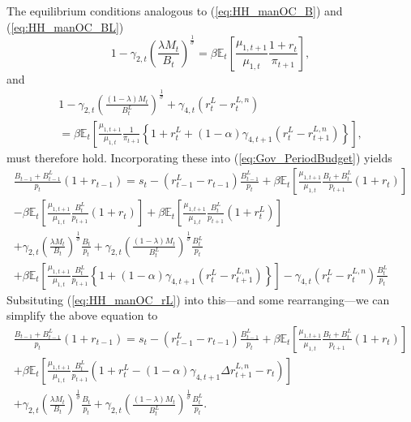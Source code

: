 \documentclass[11pt,a4paper,margin=1.5in]{article}
\begin{document}
The equilibrium conditions analogous to (\ref{eq:HH_manOC_B}) and (\ref{eq:HH_manOC_BL})
\begin{equation*}
	1 - \gamma_{2,t}\left(\frac{\lambda M_t}{B_t}\right)^\frac{1}{\sigma} = \beta \mathbb{E}_t\!\left[\frac{\mu_{1,t+1}}{\mu_{1,t}}\frac{1+r_t}{\pi_{t+1}}\right],
	\label{eq:HH_manOC_B_Alt}
\end{equation*}
and 
\begin{multline*}
	1 - \gamma_{2,t}\left(\frac{(1-\lambda)M_t}{B^L_t}\right)^\frac{1}{\sigma} + \gamma_{4,t}\left(r^L_t-r^{L,n}_t\right) \\
	= \beta \mathbb{E}_t\!\left[\frac{\mu_{1,t+1}}{\mu_{1,t}}\frac{1}{\pi_{t+1}} \left\{ 1+r^L_t + (1-\alpha)\gamma_{4,t+1} \left(r^L_t-r^{L,n}_{t+1}\right)\right\}\right],
	\label{eq:HH_manOC_BL_Alt}
\end{multline*}
must therefore hold.
Incorporating these into (\ref{eq:Gov_PeriodBudget}) yields
\begin{multline}
	\frac{B_{t-1} + B^L_{t-1}}{p_t}(1+r_{t-1})= s_t  - (r_{t-1}^L - r_{t-1})\frac{B^L_{t-1}}{p_t} + \beta\mathbb{E}_t\left[\frac{\mu_{1,t+1}}{\mu_{1,t}} \frac{B_{t} +B^L_{t}}{p_{t+1}}(1+r_{t})\right] \\ 
		- \beta\mathbb{E}_t\left[\frac{\mu_{1,t+1}}{\mu_{1,t}} \frac{B^L_{t}}{p_{t+1}}(1+r_{t})\right] + \beta\mathbb{E}_t\left[\frac{\mu_{1,t+1}}{\mu_{1,t}} \frac{B^L_{t}}{p_{t+1}}(1+r^L_{t})\right] \\
		+  \gamma_{2,t}\left(\frac{\lambda M_t}{B_t}\right)^\frac{1}{\sigma}\frac{B_t}{p_t} +\gamma_{2,t}\left(\frac{(1-\lambda) M_t}{B^L_t}\right)^\frac{1}{\sigma}\frac{B^L_t}{p_t} \\
		+\beta\mathbb{E}_t\left[\frac{\mu_{1,t+1}}{\mu_{1,t}} \frac{B^L_t}{p_{t+1}}\left\{1+  (1-\alpha)\gamma_{4,t+1}\left(r^L_t - r^{L,n}_{t+1}\right)\right\}\right] - \gamma_{4,t}\left(r^L_t - r^{L,n}_t\right)\frac{B^L_t}{p_t}
\end{multline}
Subsituting (\ref{eq:HH_manOC_rL}) into this---and some rearranging---we can simplify the above equation to
\begin{multline}
	\frac{B_{t-1} + B^L_{t-1}}{p_t}(1+r_{t-1})= s_t - (r_{t-1}^L - r_{t-1})\frac{B^L_{t-1}}{p_t} + \beta\mathbb{E}_t\left[\frac{\mu_{1,t+1}}{\mu_{1,t}} \frac{B_{t} +B^L_{t}}{p_{t+1}}(1+r_{t})\right] \\ 
		+ \beta\mathbb{E}_t\left[\frac{\mu_{1,t+1}}{\mu_{1,t}} \frac{B^L_{t}}{p_{t+1}}(1+r^L_{t} - (1-\alpha)\gamma_{4,t+1}\Delta r^{L,n}_{t+1} - r_t)\right]  \\
		+  \gamma_{2,t}\left(\frac{\lambda M_t}{B_t}\right)^\frac{1}{\sigma}\frac{B_t}{p_t} +\gamma_{2,t}\left(\frac{(1-\lambda) M_t}{B^L_t}\right)^\frac{1}{\sigma}\frac{B^L_t}{p_t}.
\end{multline}
\end{document}
